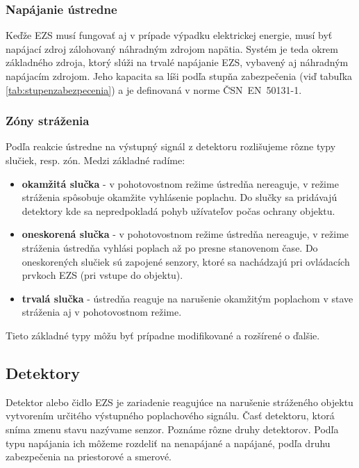 \subsubsection{Napájanie ústredne}

Keďže EZS musí fungovať aj v prípade výpadku elektrickej energie, musí byť napájací zdroj zálohovaný náhradným zdrojom napätia. Systém je teda okrem základného zdroja, ktorý slúži na trvalé napájanie EZS, vybavený aj náhradným napájacím zdrojom. Jeho kapacita sa líši podľa stupňa zabezpečenia (viď tabuľka \ref{tab:stupenzabezpecenia}) a je definovaná v norme ČSN~EN~50131-1.

\subsubsection{Zóny stráženia}

Podľa reakcie ústredne na výstupný signál z detektoru rozlišujeme rôzne typy slučiek, resp. zón. Medzi základné radíme:
\begin{itemize}
    \item \textbf{okamžitá slučka} - v pohotovostnom režime ústredňa nereaguje, v režime stráženia spôsobuje okamžite vyhlásenie poplachu. Do slučky sa pridávajú detektory kde sa nepredpokladá pohyb užívateľov počas ochrany objektu.
    \item \textbf{oneskorená slučka} - v pohotovostnom režime ústredňa nereaguje, v režime stráženia ústredňa vyhlási poplach až po presne stanovenom čase. Do oneskorených slučiek sú zapojené senzory, ktoré sa nachádzajú pri ovládacích prvkoch EZS (pri vstupe do objektu).
    \item \textbf{trvalá slučka} - ústredňa reaguje na narušenie okamžitým poplachom v stave stráženia aj v pohotovostnom režime.
\end{itemize}
Tieto základné typy môžu byť prípadne modifikované a rozšírené o ďalšie.\cite{velas_ezs}

\subsection{Detektory}

Detektor alebo čidlo EZS je zariadenie reagujúce na narušenie stráženého objektu vytvorením určitého výstupného poplachového signálu. Časť detektoru, ktorá sníma zmenu stavu nazývame senzor. Poznáme rôzne druhy detektorov. Podľa typu napájania ich môžeme rozdeliť na nenapájané a napájané, podľa druhu zabezpečenia na priestorové a smerové.

